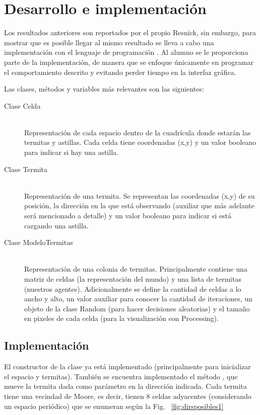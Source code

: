 \section{Desarrollo e implementaci\'on}
Los resultados anteriores son reportados por el propio Resnick, sin embargo, para mostrar que es posible llegar al mismo resultado se lleva a cabo una implementación con el lenguaje de programación .
Al alumno se le proporciona parte de la implementación, de manera que se enfoque únicamente en programar el comportamiento descrito y evitando perder tiempo en la interfaz gráfica.

Las clases, métodos y variables más relevantes son las siguientes:
\pagebreak

\begin{description}%
  \item[Clase Celda] \hfill \\
    Representación de cada espacio dentro de la cuadrícula donde estarán las termitas y astillas.
    Cada celda tiene coordenadas (x,y) y un valor booleano para indicar si hay una astilla.

  \item[Clase Termita] \hfill \\
    Representación de una termita. Se representan las coordenadas (x,y) de su posición, la dirección en la que está observando (auxiliar que más adelante será mencionado a detalle) y un valor booleano para indicar si está cargando una astilla.

  \item[Clase ModeloTermitas] \hfill \\
    Representación de una colonia de termitas. Principalmente contiene una matriz de celdas (la representación del mundo) y una lista de termitas (nuestros agentes). Adicionalmente se define la cantidad de celdas a lo ancho y alto, un valor auxiliar para conocer la cantidad de iteraciones, un objeto de la clase Random (para hacer decisiones aleatorias) y el tamaño en pixeles de cada celda (para la visualización con Processing).
\end{description}

\subsection{Implementaci\'on}
El constructor de la clase  ya está implementado (principalmente para inicializar el espacio y termitas). También se encuentra implementado el método , que mueve la termita dada como parámetro en la dirección indicada. Cada termita tiene una vecindad de Moore, es decir, tienen 8 celdas adyacentes (considerando un espacio periódico) que se enumeran según la Fig. ~\ref{fig:dirsposibles1} \par

